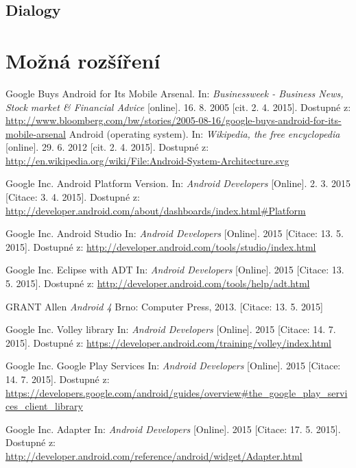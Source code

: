 \documentclass[12pt]{article}
\begin{document}
\subsection{Dialogy}
\section{Možná rozšíření}

\newpage
\begin{thebibliography}{1} %
 Google Buys Android for Its Mobile Arsenal. In: \emph{Businessweek - Business News, Stock market \& Financial Advice} [online]. 16. 8. 2005 [cit. 2. 4. 2015]. Dostupné
z: \url{http://www.bloomberg.com/bw/stories/2005-08-16/google-buys-android-for-its-mobile-arsenal}
 Android (operating system). In: \emph{Wikipedia, the free encyclopedia} [online]. 29. 6. 2012 [cit. 2. 4. 2015]. Dostupné z: \url{http://en.wikipedia.org/wiki/File:Android-System-Architecture.svg}

 Google Inc. Android Platform Version. In: \emph{Android Developers}
[Online]. 2. 3. 2015 [Citace: 3. 4. 2015]. Dostupné z: \url{http://developer.android.com/about/dashboards/index.html#Platform}

 Google Inc. Android Studio In: \emph{Android Developers}
[Online]. 2015 [Citace: 13. 5. 2015]. Dostupné z: \url{http://developer.android.com/tools/studio/index.html}

 Google Inc. Eclipse with ADT In: \emph{Android Developers}
[Online]. 2015 [Citace: 13. 5. 2015]. Dostupné z: \url{http://developer.android.com/tools/help/adt.html}

 GRANT Allen \emph{Android 4}
	Brno: Computer Press, 2013.
		[Citace: 13. 5. 2015]

 Google Inc. Volley library In: \emph{Android Developers}
[Online]. 2015 [Citace: 14. 7. 2015]. Dostupné z:
\url{https://developer.android.com/training/volley/index.html}

 Google Inc. Google Play Services In: \emph{Android Developers}
[Online]. 2015 [Citace: 14. 7. 2015]. Dostupné z:
\url{https://developers.google.com/android/guides/overview#the_google_play_services_client_library}

 Google Inc. Adapter In: \emph{Android Developers}
[Online]. 2015 [Citace: 17. 5. 2015]. Dostupné z: \url{http://developer.android.com/reference/android/widget/Adapter.html}


\end{thebibliography}
\end{document}
